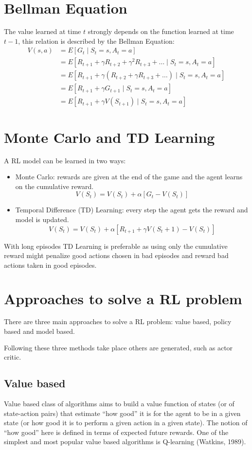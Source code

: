 \documentclass[Lau,oneside,noexaminfo]{sapthesis} %
\begin{document}
\section{Bellman Equation}
The value learned at time $t$ strongly depends on the function learned at time $t-1$, this relation is described by the Bellman Equation:
\begin{align}
V(s, a) &= E[G_t \mid S_t=s, A_t = a] \\
&= E[R_{t+1} + \gamma R_{t+2} + \gamma^2 R_{t+3} + \dots \mid S_t=s, A_t = a] \\
&= E[R_{t+1} + \gamma (R_{t+2} + \gamma R_{t+3} + \dots) \mid S_t=s, A_t = a] \\
&= E[R_{t+1} + \gamma G_{t+1} \mid S_t=s, A_t = a] \\
&= E[R_{t+1} + \gamma V(S_{t+1}) \mid S_t=s, A_t = a]
\label{bellman}
\end{align}
\section{Monte Carlo and TD Learning}
A RL model can be learned in two ways:
\begin{itemize}
	\item Monte Carlo: rewards are given at the end of the game and the agent learns on the cumulative reward.
	\begin{equation}
V( S_t ) = V( S_t ) + \alpha[ G_t - V(S_t) ]
	\end{equation}
	\item Temporal Difference (TD) Learning: every step the agent gets the reward and model is updated.
	\begin{equation}
V( S_t ) = V( S_t ) + \alpha[ R_{t+1} + \gamma V(S_t+1)- V(S_t) ]
	\end{equation}
\end{itemize}
With long episodes TD Learning is preferable as using only the cumulative reward might penalize good actions chosen in bad episodes and reward bad actions taken in good episodes.


\section{Approaches to solve a RL problem}
There are three main approaches to solve a RL problem: value based, policy based and model based. 

Following these three methods take place others are generated, such as actor critic.
\subsection{Value based}
Value based class of algorithms aims to build a value function of states (or of state-action pairs) that estimate “how good” it is for the agent to be in a given state (or how good it is to perform a given action in a given state). The notion of “how good” here is defined in terms of expected future rewards. One of the simplest and most popular value based algorithms is Q-learning (Watkins, 1989). 
\end{document}
